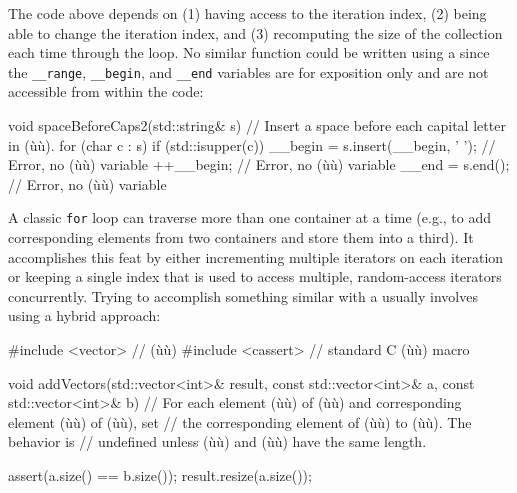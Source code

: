 {{{\noindent The code above depends on (1) having access to the iteration index, (2)
being able to change the iteration index, and (3) recomputing the size
of the collection each time through the loop. No similar function could
be written using a  since the
\lstinline!__range!, \lstinline!__begin!, and \lstinline!__end! variables
are for exposition only and are not accessible from within the code:

\begin{emcppslisting}[emcppsbatch=e7]
void spaceBeforeCaps2(std::string& s)
{
    // Insert a space before each capital letter in (ù{}ù).
    for (char c : s)
    {
        if (std::isupper(c))
        {
            __begin = s.insert(__begin, ' ');  // Error, no (ù{}ù) variable
            ++__begin;                         // Error, no (ù{}ù) variable
            __end = s.end();                   // Error, no (ù{}ù) variable
        }
    }
}
\end{emcppslisting}


\noindent A classic \lstinline!for! loop can traverse more than one container at a
time (e.g., to add corresponding elements from two containers and store
them into a third). It accomplishes this feat by either incrementing
multiple iterators on each iteration or keeping a single index that is
used to access multiple, random-access iterators concurrently. Trying to
accomplish something similar with a  usually involves using a hybrid approach:

\begin{emcppslisting}
#include <vector>   // (ù{}ù)
#include <cassert>  // standard C (ù{}ù) macro

void addVectors(std::vector<int>&       result,
                const std::vector<int>& a,
                const std::vector<int>& b)
    // For each element (ù{}ù) of (ù{}ù) and corresponding element (ù{}ù) of (ù{}ù), set
    // the corresponding element of (ù{}ù) to (ù{}ù).  The behavior is
    // undefined unless (ù{}ù) and (ù{}ù) have the same length.
{
    assert(a.size() == b.size());
    result.resize(a.size());

}
\end{emcppslisting}}}}
